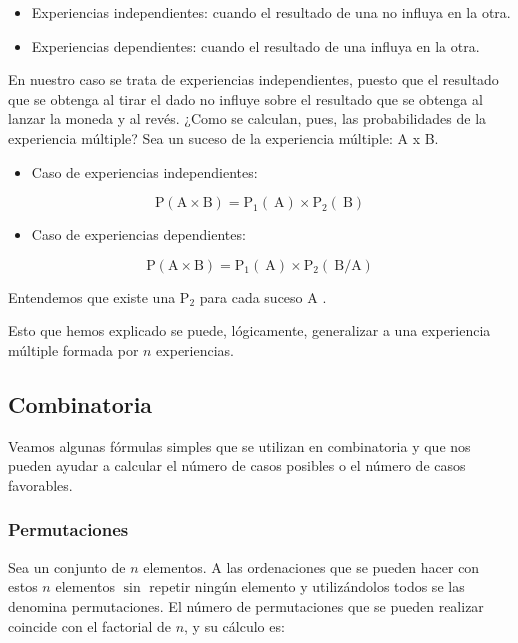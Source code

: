 \documentclass[
]{article}
\providecommand{\tightlist}{%
  \setlength{\itemsep}{0pt}\setlength{\parskip}{0pt}}
\begin{document}
\begin{itemize}
\tightlist
\item
  Experiencias independientes: cuando el resultado de una no influya
  en la otra.
\item
  Experiencias dependientes: cuando el resultado de una influya en la
  otra.
\end{itemize}

En nuestro caso se trata de experiencias independientes, puesto que el
resultado que se obtenga al tirar el dado no influye sobre el resultado
que se obtenga al lanzar la moneda y al revés. ¿Como se calculan, pues,
las probabilidades de la experiencia múltiple? Sea un suceso de la
experiencia múltiple: A x B.

\begin{itemize}
\tightlist
\item
  Caso de experiencias independientes:
\end{itemize}

\[
\mathrm{P}(\mathrm{A} \times \mathrm{B})=\mathrm{P}_{1}(\mathrm{~A}) \times \mathrm{P}_{2}(\mathrm{~B})
\]

\begin{itemize}
\tightlist
\item
  Caso de experiencias dependientes:
\end{itemize}

\[
\mathrm{P}(\mathrm{A} \times \mathrm{B})=\mathrm{P}_{1}(\mathrm{~A}) \times \mathrm{P}_{2}(\mathrm{~B} / \mathrm{A})
\]

Entendemos que existe una \(\mathrm{P}_{2}\) para cada suceso A .

Esto que hemos explicado se puede, lógicamente, generalizar a una
experiencia múltiple formada por \(n\) experiencias.

\subsection{Combinatoria}\label{combinatoria}

Veamos algunas fórmulas simples que se utilizan en combinatoria y que
nos pueden ayudar a calcular el número de casos posibles o el número de
casos favorables.

\subsubsection{Permutaciones}\label{permutaciones}

Sea un conjunto de \(n\) elementos. A las ordenaciones que se pueden hacer
con estos \(n\) elementos \(\sin\) repetir ningún elemento y utilizándolos
todos se las denomina permutaciones. El número de permutaciones que se
pueden realizar coincide con el factorial de \(n\), y su cálculo es:
\end{document}
